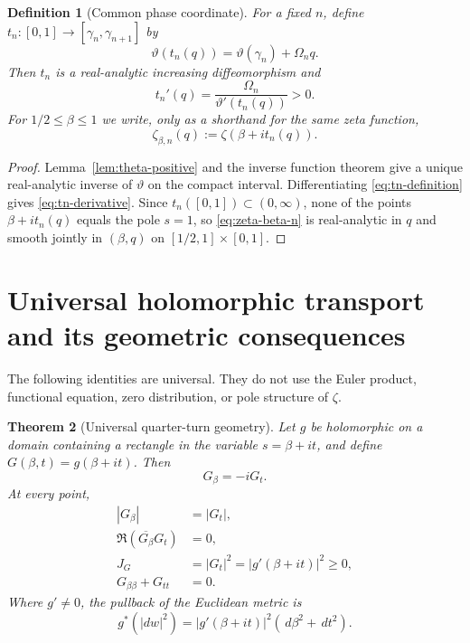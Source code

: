 \documentclass[11pt]{amsart}
\numberwithin{equation}{section}
\newtheorem{theorem}{Theorem}[section]
\newtheorem{definition}[theorem]{Definition}
\newcommand{\dd}{\,d}
\begin{document}
\begin{definition}[Common phase coordinate]
\label{def:phase-coordinate}
For a fixed $n$, define $t_n:[0,1]\to[\gamma_n,\gamma_{n+1}]$ by
\begin{equation}
 \boxed{
 \vartheta(t_n(q))
 =\vartheta(\gamma_n)+\Omega_n q.
 }
 \label{eq:tn-definition}
\end{equation}
Then $t_n$ is a real-analytic increasing diffeomorphism and
\begin{equation}
 \boxed{
 t_n'(q)=\frac{\Omega_n}{\vartheta'(t_n(q))}>0.
 }
 \label{eq:tn-derivative}
\end{equation}
For $1/2\leq\beta\leq1$ we write, only as a shorthand for the same zeta
function,
\begin{equation}
 \zeta_{\beta,n}(q)
 :=\zeta(\beta+i t_n(q)).
 \label{eq:zeta-beta-n}
\end{equation}
\end{definition}

\begin{proof}
Lemma~\ref{lem:theta-positive} and the inverse function theorem give a unique
real-analytic inverse of $\vartheta$ on the compact interval.  Differentiating
\eqref{eq:tn-definition} gives \eqref{eq:tn-derivative}.  Since
$t_n([0,1])\subset(0,\infty)$, none of the points
$\beta+i t_n(q)$ equals the pole $s=1$, so
\eqref{eq:zeta-beta-n} is real-analytic in $q$ and smooth jointly in
$(\beta,q)$ on $[1/2,1]\times[0,1]$.
\end{proof}

\section{Universal holomorphic transport and its geometric consequences}
\label{sec:universal-transport}

The following identities are universal.  They do not use the Euler product,
functional equation, zero distribution, or pole structure of $\zeta$.

\begin{theorem}[Universal quarter-turn geometry]
\label{thm:universal-quarter-turn}
Let $g$ be holomorphic on a domain containing a rectangle in the variable
$s=\beta+it$, and define $G(\beta,t)=g(\beta+it)$.  Then
\begin{equation}
 \boxed{G_\beta=-iG_t.}
 \label{eq:universal-cr}
\end{equation}
At every point,
\begin{align}
 |G_\beta|&=|G_t|,
 \label{eq:universal-isometry}\\
 \Re(\overline{G_\beta}G_t)&=0,
 \label{eq:universal-orthogonality}\\
 J_G&=|G_t|^2=|g'(\beta+it)|^2\geq0,
 \label{eq:universal-jacobian}\\
 G_{\beta\beta}+G_{tt}&=0.
 \label{eq:universal-harmonicity}
\end{align}
Where $g'\neq0$, the pullback of the Euclidean metric is
\begin{equation}
 \boxed{
 g^*(|dw|^2)=|g'(\beta+it)|^2(\dd\beta^2+\dd t^2).
 }
 \label{eq:universal-conformal-metric}
\end{equation}
\end{theorem}
\end{document}
